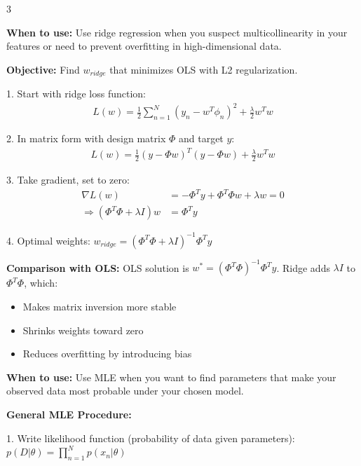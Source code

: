 \documentclass[10pt,landscape]{article}
\begin{document}
\begin{multicols}{3}
\begin{tcolorbox}[breakable, title=1.1 Ridge Regression Derivation, colback=regression,boxsep=1pt,left=1pt,right=1pt,top=1pt,bottom=1pt]
\textbf{When to use:} Use ridge regression when you suspect multicollinearity in your features or need to prevent overfitting in high-dimensional data.

\textbf{Objective:} Find $w_{ridge}$ that minimizes OLS with L2 regularization.

1. Start with ridge loss function:
\begin{align}
L(w) = \frac{1}{2}\sum_{n=1}^{N}(y_n - w^T\phi_n)^2 + \frac{\lambda}{2}w^Tw
\end{align}

2. In matrix form with design matrix $\Phi$ and target $y$:
\begin{align}
L(w) = \frac{1}{2}(y - \Phi w)^T(y - \Phi w) + \frac{\lambda}{2}w^Tw
\end{align}

3. Take gradient, set to zero:
\begin{align}
\nabla L(w) &= -\Phi^Ty + \Phi^T\Phi w + \lambda w = 0\\
\Rightarrow (\Phi^T\Phi + \lambda I)w &= \Phi^Ty
\end{align}

4. Optimal weights: $w_{ridge} = (\Phi^T\Phi + \lambda I)^{-1}\Phi^Ty$

\textbf{Comparison with OLS:} 
OLS solution is $w^* = (\Phi^T\Phi)^{-1}\Phi^Ty$. 
Ridge adds $\lambda I$ to $\Phi^T\Phi$, which:
\begin{itemize}[leftmargin=*,noitemsep,topsep=0pt]
    \item Makes matrix inversion more stable
    \item Shrinks weights toward zero
    \item Reduces overfitting by introducing bias
\end{itemize}
\end{tcolorbox}

\begin{tcolorbox}[breakable, title=1.2 Maximum Likelihood Estimation, colback=regression,boxsep=1pt,left=1pt,right=1pt,top=1pt,bottom=1pt]
\textbf{When to use:} Use MLE when you want to find parameters that make your observed data most probable under your chosen model.

\textbf{General MLE Procedure:}

1. Write likelihood function (probability of data given parameters):
$p(D|\theta) = \prod_{n=1}^{N} p(x_n|\theta)$


\end{tcolorbox}
\end{multicols}
\end{document}
